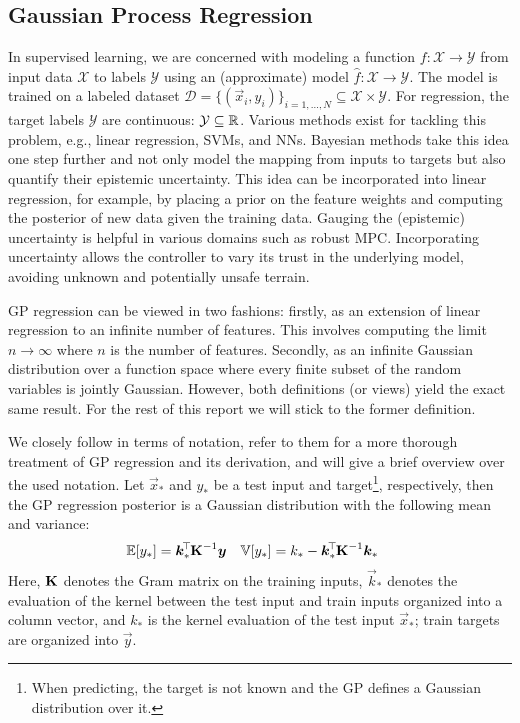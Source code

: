 \subsection{Gaussian Process Regression}
	In supervised learning, we are concerned with modeling a function $f : \mathcal{X} \to \mathcal{Y}$ from input data $\mathcal{X}$ to labels $\mathcal{Y}$ using an (approximate) model $\hat{f} : \mathcal{X} \to \mathcal{Y}$.
	The model is trained on a labeled dataset $\mathcal{D} = \{ (\vec{x}_i, y_i) \}_{i = 1, \dots, N} \subseteq \mathcal{X} \times \mathcal{Y}$.
	For regression, the target labels $\mathcal{Y}$ are continuous: $\mathcal{Y} \subseteq \mathbb{R}$.
	Various methods exist for tackling this problem, e.g., linear regression, \acp{SVM}, and \acp{NN}.
	Bayesian methods take this idea one step further and not only model the mapping from inputs to targets but also quantify their epistemic uncertainty.
	This idea can be incorporated into linear regression, for example, by placing a prior on the feature weights and computing the posterior of new data given the training data.
	Gauging the (epistemic) uncertainty is helpful in various domains such as robust \ac{MPC}.
	Incorporating uncertainty allows the controller to vary its trust in the underlying model, avoiding unknown and potentially unsafe terrain.

	\ac{GP} regression can be viewed in two fashions:
	firstly, as an extension of linear regression to an infinite number of features.
	This involves computing the limit $n \to \infty$ where $n$ is the number of features.
	Secondly, as an infinite Gaussian distribution over a function space where every finite subset of the random variables is jointly Gaussian.
	However, both definitions (or views) yield the exact same result.
	For the rest of this report we will stick to the former definition.

	We closely follow\cite{rasmussenGaussianProcessesMachine2006} in terms of notation, refer to them for a more thorough treatment of \ac{GP} regression and its derivation, and will give a brief overview over the used notation.
	Let \(\vec{x}_\ast\) and \(y_\ast\) be a test input and target\footnote{When predicting, the target is not known and the \ac{GP} defines a Gaussian distribution over it.}, respectively, then the \ac{GP} regression posterior is a Gaussian distribution with the following mean and variance:
	\begin{equation}
		\begin{aligned}
			\mathbb{E}[y_\ast] &= \bm{k}_\ast^{\!\top\!} \bm{\mathrm{K}}^{-1} \bm{y} &
			\mathbb{V}[y_\ast] &= k_\ast - \bm{k}_\ast^{\!\top\!} \bm{\mathrm{K}}^{-1} \bm{k}_\ast
		\end{aligned}
		\label{eq:gp}
	\end{equation}
	Here, \( \bm{\mathrm{K}} \) denotes the Gram matrix on the training inputs, \(\vec{k}_\ast\) denotes the evaluation of the kernel between the test input and train inputs organized into a column vector, and \(k_\ast\) is the kernel evaluation of the test input \(\vec{x}_\ast\); train targets are organized into \(\vec{y}\).

